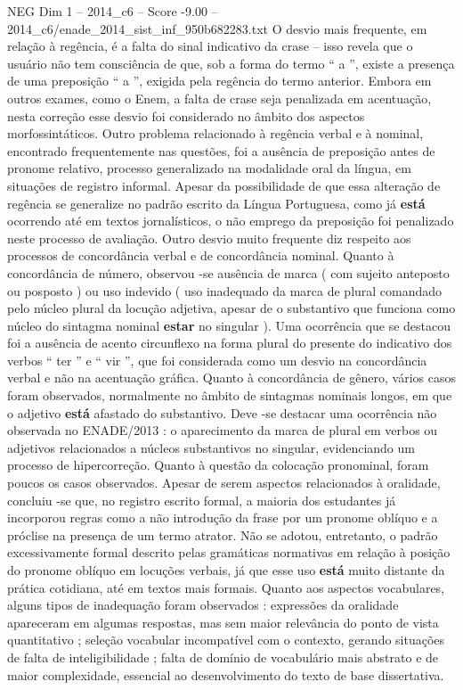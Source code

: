\begin{textsample}{NEG Dim 1 – 2014\_c6 – Score -9.00 – 2014\_c6/enade\_2014\_sist\_inf\_950b682283.txt}
O desvio mais frequente, em relação à regência, é a falta do sinal indicativo da crase – isso revela que o usuário não tem consciência de que, sob a forma do termo “ a ”, existe a presença de uma preposição “ a ”, exigida pela regência do termo anterior.
Embora em outros exames, como o Enem, a falta de crase seja penalizada em acentuação, nesta correção esse desvio foi considerado no âmbito dos aspectos morfossintáticos.
Outro problema relacionado à regência verbal e à nominal, encontrado frequentemente nas questões, foi a ausência de preposição antes de pronome relativo, processo generalizado na modalidade oral da língua, em situações de registro informal.
Apesar da possibilidade de que essa alteração de regência se generalize no padrão escrito da Língua Portuguesa, como já \textbf{está} ocorrendo até em textos jornalísticos, o não emprego da preposição foi penalizado neste processo de avaliação.
Outro desvio muito frequente diz respeito aos processos de concordância verbal e de concordância nominal.
Quanto à concordância de número, observou -se ausência de marca ( com sujeito anteposto ou posposto ) ou uso indevido ( uso inadequado da marca de plural comandado pelo núcleo plural da locução adjetiva, apesar de o substantivo que funciona como núcleo do sintagma nominal \textbf{estar} no singular ).
Uma ocorrência que se destacou foi a ausência de acento circunflexo na forma plural do presente do indicativo dos verbos “ ter ” e “ vir ”, que foi considerada como um desvio na concordância verbal e não na acentuação gráfica.
Quanto à concordância de gênero, vários casos foram observados, normalmente no âmbito de sintagmas nominais longos, em que o adjetivo \textbf{está} afastado do substantivo.
Deve -se destacar uma ocorrência não observada no ENADE/2013 : o aparecimento da marca de plural em verbos ou adjetivos relacionados a núcleos substantivos no singular, evidenciando um processo de hipercorreção.
Quanto à questão da colocação pronominal, foram poucos os casos observados.
Apesar de serem aspectos relacionados à oralidade, concluiu -se que, no registro escrito formal, a maioria dos estudantes já incorporou regras como a não introdução da frase por um pronome oblíquo e a próclise na presença de um termo atrator.
Não se adotou, entretanto, o padrão excessivamente formal descrito pelas gramáticas normativas em relação à posição do pronome oblíquo em locuções verbais, já que esse uso \textbf{está} muito distante da prática cotidiana, até em textos mais formais.
Quanto aos aspectos vocabulares, alguns tipos de inadequação foram observados : expressões da oralidade apareceram em algumas respostas, mas sem maior relevância do ponto de vista quantitativo ; seleção vocabular incompatível com o contexto, gerando situações de falta de inteligibilidade ; falta de domínio de vocabulário mais abstrato e de maior complexidade, essencial ao desenvolvimento do texto de base dissertativa.

\end{textsample}
